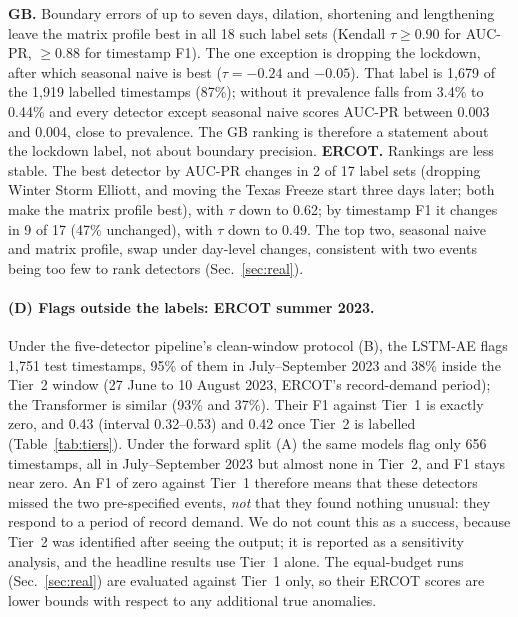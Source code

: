 \documentclass[10pt,twocolumn]{article}
\begin{document}
\textbf{GB.} Boundary errors of up to seven days, dilation, shortening and lengthening leave the matrix profile best in all 18 such label sets (Kendall $\tau\ge0.90$ for AUC-PR, $\ge0.88$ for timestamp F1). The one exception is dropping the lockdown, after which seasonal naive is best ($\tau=-0.24$ and $-0.05$). That label is 1{,}679 of the 1{,}919 labelled timestamps (87\%); without it prevalence falls from 3.4\% to 0.44\% and every detector except seasonal naive scores AUC-PR between 0.003 and 0.004, close to prevalence. The GB ranking is therefore a statement about the lockdown label, not about boundary precision. \textbf{ERCOT.} Rankings are less stable. The best detector by AUC-PR changes in 2 of 17 label sets (dropping Winter Storm Elliott, and moving the Texas Freeze start three days later; both make the matrix profile best), with $\tau$ down to 0.62; by timestamp F1 it changes in 9 of 17 (47\% unchanged), with $\tau$ down to 0.49. The top two, seasonal naive and matrix profile, swap under day-level changes, consistent with two events being too few to rank detectors (Sec.~\ref{sec:real}).

\begin{table}[t]
\centering\scriptsize\setlength{\tabcolsep}{3pt}
\resizebox{\textwidth}{!}{}
\caption{Analysis C: stability of the detector ranking under label perturbations (Kendall $\tau$ of the full ranking against the unperturbed labels; 19 label sets for GB, 17 for ERCOT).}\label{tab:labelC}
\end{table}

\paragraph{(D) Flags outside the labels: ERCOT summer 2023.} Under the five-detector pipeline's clean-window protocol (B), the LSTM-AE flags 1{,}751 test timestamps, 95\% of them in July--September 2023 and 38\% inside the Tier~2 window (27 June to 10 August 2023, ERCOT's record-demand period); the Transformer is similar (93\% and 37\%). Their F1 against Tier~1 is exactly zero, and 0.43 (interval 0.32--0.53) and 0.42 once Tier~2 is labelled (Table~\ref{tab:tiers}). Under the forward split (A) the same models flag only 656 timestamps, all in July--September 2023 but almost none in Tier~2, and F1 stays near zero. An F1 of zero against Tier~1 therefore means that these detectors missed the two pre-specified events, \emph{not} that they found nothing unusual: they respond to a period of record demand. We do not count this as a success, because Tier~2 was identified after seeing the output; it is reported as a sensitivity analysis, and the headline results use Tier~1 alone. The equal-budget runs (Sec.~\ref{sec:real}) are evaluated against Tier~1 only, so their ERCOT scores are lower bounds with respect to any additional true anomalies.
\end{document}

